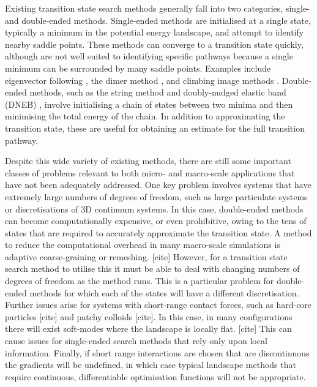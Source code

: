 \documentclass[aps,twocolumn]{revtex4}
\newcommand{\temp}[1]{{\leavevmode\color{red}#1}}
\begin{document}
\topic Existing transition state search methods generally fall into two categories, single- and double-ended methods.
Single-ended methods are initialised at a single state, typically a minimum in the potential energy landscape, and attempt to identify nearby saddle points.
These methods can converge to a transition state quickly, although are not well suited to identifying specific pathways because a single minimum can be surrounded by many saddle points.
Examples include eigenvector following \cite{Cerjan1981}, the dimer method \cite{Heyden2005,Kastner2008}, and climbing image methods \cite{E2007,Ren2013}.
Double-ended methods, such as the string method \cite{E2002,E2007} and doubly-nudged elastic band (DNEB) \cite{Trygubenko2004}, involve initialising a chain of states between two minima and then minimising the total energy of the chain.
In addition to approximating the transition state, these are useful for obtaining an estimate for the full transition pathway.

\topic Despite this wide variety of existing methods, there are still some important classes of problems relevant to both micro- and macro-scale applications that have not been adequately addressed.
One key problem involves systems that have extremely large numbers of degrees of freedom, such as large particulate systems or discretisations of 3D continuum systems.
In this case, double-ended methods can become computationally expensive, or even prohibitive, owing to the tens of states that are required to accurately approximate the transition state.
A method to reduce the computational overhead in many macro-scale simulations is adaptive coarse-graining or remeshing. \temp{[cite]}
However, for a transition state search method to utilise this it must be able to deal with changing numbers of degrees of freedom as the method runs.
This is a particular problem for double-ended methods for which each of the states will have a different discretisation.
Further issues arise for systems with short-range contact forces, such as hard-core particles \temp{[cite]} and patchy colloids \temp{[cite]}.
In this case, in many configurations there will exist soft-modes where the landscape is locally flat. \temp{[cite]}
This can cause issues for single-ended search methods that rely only upon local information.
Finally, if short range interactions are chosen that are discontinuous the gradients will be undefined, in which case typical landscape methods that require continuous, differentiable optimisation functions will not be appropriate.
\end{document}
